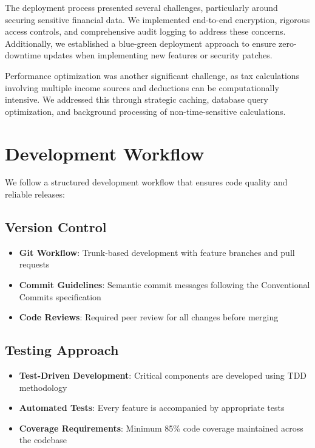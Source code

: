 \documentclass[
  11pt,
  letterpaper,
]{article}
\providecommand{\tightlist}{%
  \setlength{\itemsep}{0pt}\setlength{\parskip}{0pt}}\usepackage{longtable,booktabs,array}
\begin{document}
The deployment process presented several challenges, particularly around
securing sensitive financial data. We implemented end-to-end encryption,
rigorous access controls, and comprehensive audit logging to address
these concerns. Additionally, we established a blue-green deployment
approach to ensure zero-downtime updates when implementing new features
or security patches.

Performance optimization was another significant challenge, as tax
calculations involving multiple income sources and deductions can be
computationally intensive. We addressed this through strategic caching,
database query optimization, and background processing of
non-time-sensitive calculations.

\hypertarget{development-workflow}{%
\section{Development Workflow}\label{development-workflow}}

We follow a structured development workflow that ensures code quality
and reliable releases:

\hypertarget{version-control}{%
\subsection{Version Control}\label{version-control}}

\begin{itemize}
\tightlist
\item
  \textbf{Git Workflow}: Trunk-based development with feature branches
  and pull requests
\item
  \textbf{Commit Guidelines}: Semantic commit messages following the
  Conventional Commits specification
\item
  \textbf{Code Reviews}: Required peer review for all changes before
  merging
\end{itemize}

\hypertarget{testing-approach}{%
\subsection{Testing Approach}\label{testing-approach}}

\begin{itemize}
\tightlist
\item
  \textbf{Test-Driven Development}: Critical components are developed
  using TDD methodology
\item
  \textbf{Automated Tests}: Every feature is accompanied by appropriate
  tests
\item
  \textbf{Coverage Requirements}: Minimum 85\% code coverage maintained
  across the codebase
\end{itemize}
\end{document}
